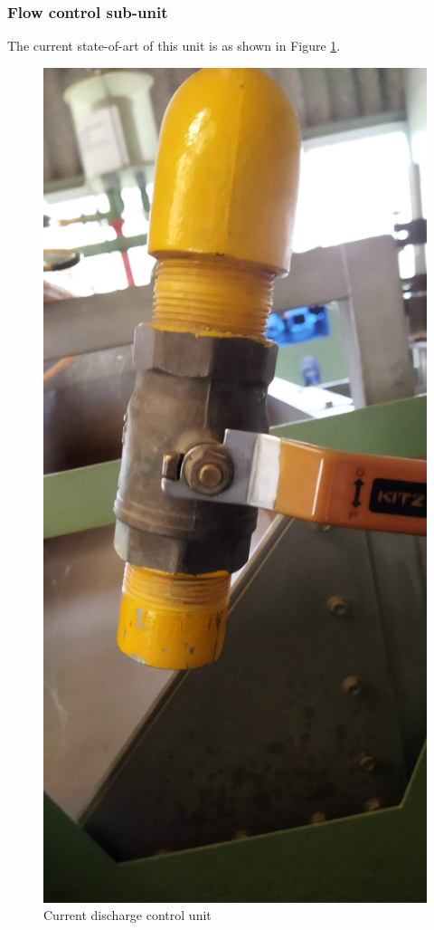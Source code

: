 \subsubsection{Flow control  sub-unit}
The current state-of-art of this unit is as shown in Figure \ref{fig:current_discharge_control_unit}. 
\begin{figure}[H]
    \centering
    \includegraphics[height=0.25\textheight,keepaspectratio]{Figures/ballValve.jpg}
    \caption{Current discharge control unit}
    \label{fig:current_discharge_control_unit}
\end{figure}
